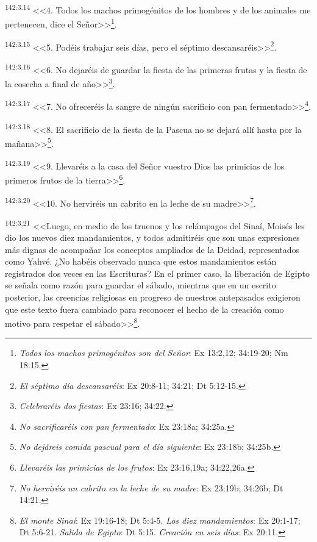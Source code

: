 \par 
\textsuperscript{142:3.14} <<4. Todos los machos primogénitos de los hombres y de los animales me pertenecen, dice el Señor>>\footnote{\textit{Todos los machos primogénitos son del Señor}: Ex 13:2,12; 34:19-20; Nm 18:15.}.

\par 
\textsuperscript{142:3.15} <<5. Podéis trabajar seis días, pero el séptimo descansaréis>>\footnote{\textit{El séptimo día descansaréis}: Ex 20:8-11; 34:21; Dt 5:12-15.}.

\par 
\textsuperscript{142:3.16} <<6. No dejaréis de guardar la fiesta de las primeras frutas y la fiesta de la cosecha a final de año>>\footnote{\textit{Celebraréis dos fiestas}: Ex 23:16; 34:22.}.

\par 
\textsuperscript{142:3.17} <<7. No ofreceréis la sangre de ningún sacrificio con pan fermentado>>\footnote{\textit{No sacrificaréis con pan fermentado}: Ex 23:18a; 34:25a.}.

\par 
\textsuperscript{142:3.18} <<8. El sacrificio de la fiesta de la Pascua no se dejará allí hasta por la mañana>>\footnote{\textit{No dejáreis comida pascual para el día siguiente}: Ex 23:18b; 34:25b.}.

\par 
\textsuperscript{142:3.19} <<9. Llevaréis a la casa del Señor vuestro Dios las primicias de los primeros frutos de la tierra>>\footnote{\textit{Llevaréis las primicias de los frutos}: Ex 23:16,19a; 34:22,26a.}.

\par 
\textsuperscript{142:3.20} <<10. No herviréis un cabrito en la leche de su madre>>\footnote{\textit{No herviréis un cabrito en la leche de su madre}: Ex 23:19b; 34:26b; Dt 14:21.}.

\par 
\textsuperscript{142:3.21} <<Luego, en medio de los truenos y los relámpagos del Sinaí, Moisés les dio los nuevos diez mandamientos, y todos admitiréis que son unas expresiones más dignas de acompañar los conceptos ampliados de la Deidad, representados como Yahvé. ¿No habéis observado nunca que estos mandamientos están registrados dos veces en las Escrituras? En el primer caso, la liberación de Egipto se señala como razón para guardar el sábado, mientras que en un escrito posterior, las creencias religiosas en progreso de nuestros antepasados exigieron que este texto fuera cambiado para reconocer el hecho de la creación como motivo para respetar el sábado>>\footnote{\textit{El monte Sinaí}: Ex 19:16-18; Dt 5:4-5. \textit{Los diez mandamientos}: Ex 20:1-17; Dt 5:6-21. \textit{Salida de Egipto}: Dt 5:15. \textit{Creación en seis días}: Ex 20:11.}.

